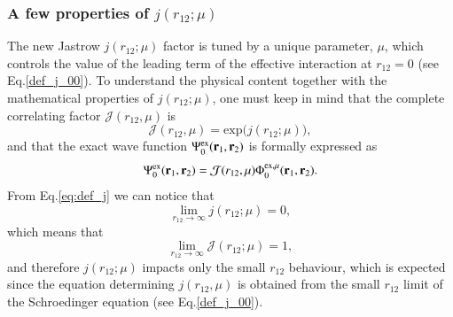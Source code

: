 \documentclass[aip,jcp,reprint,noshowkeys,superscriptaddress]{revtex4-1}
\newcommand{\br}[0]{{\bf {r}}}
\newcommand{\psiex}[0]{\Psi^{\text{ex}}_0}
\newcommand{\phimu}[0]{\Phi^{\text{ex},\mu}_0}
\begin{document}
\subsubsection{A few properties of $j(r_{12};\mu)$}
The new Jastrow $j(r_{12};\mu)$ factor is tuned by a unique parameter, $\mu$, which controls the value of the leading term of the effective interaction at $r_{12}=0$ (see Eq.\eqref{def_j_00}). 
To understand the physical content together with the mathematical properties of $j(r_{12};\mu)$, 
one must keep in mind that the complete correlating factor $\mathcal{J}(r_{12},\mu)$ is 
\begin{equation}
 \mathcal{J}(r_{12},\mu) = \text{exp}\bigg(j(r_{12};\mu)\bigg),
\end{equation}
and that the exact wave function $\psiex(\br{}_1,\br{}_2)$ is formally expressed as 
\begin{equation}
 \psiex(\br{}_1,\br{}_2) = \mathcal{J}(r_{12},\mu) \phimu(\br{}_{1},\br{}_{2}).  
\end{equation}
From Eq.\eqref{eq:def_j} we can notice that 
\begin{equation}
 \lim_{r_{12} \rightarrow \infty}j(r_{12};\mu) = 0,
\end{equation}
which means that 
\begin{equation}
 \lim_{r_{12} \rightarrow \infty}\mathcal{J}(r_{12};\mu) = 1,
\end{equation}
and therefore $j(r_{12};\mu)$ impacts only the small $r_{12}$ behaviour,  
which is expected since the equation determining $j(r_{12},\mu)$ is obtained from the small $r_{12}$ limit of the Schroedinger equation (see Eq.\eqref{def_j_00}). 
\end{document}
